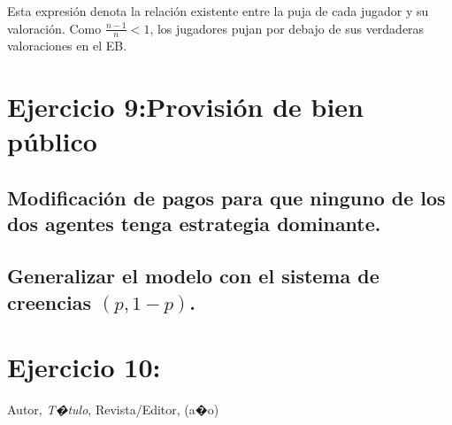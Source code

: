 \documentclass{article}
\theoremstyle{definition}
\theoremstyle{remark}
\begin{document}
Esta expresi\'on denota la relaci\'on existente entre la puja de cada jugador y su valoraci\'on. Como $\frac{n-1}{n}<1$, los jugadores pujan por debajo de sus verdaderas valoraciones en el EB.

\section{Ejercicio 9:Provisi\'on de bien p\'ublico}
\subsection{Modificaci\'on de pagos para que ninguno de los dos agentes tenga estrategia dominante.}
\subsection{Generalizar el modelo con el sistema de creencias $(p,1-p)$.}
\section{Ejercicio 10:}



























































\begin{thebibliography}{99}

 Autor, \emph{T�tulo}, Revista/Editor, (a�o)

\end{thebibliography}
\end{document}
